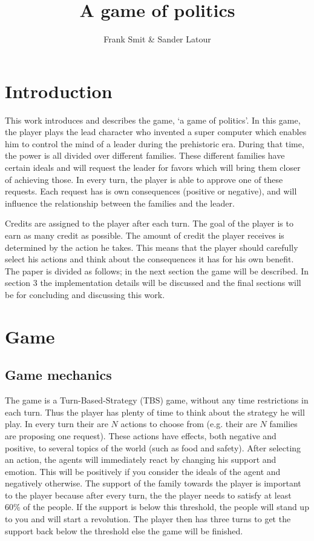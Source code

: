 \documentclass[11pt,a4paper]{article}
\author{Frank Smit \& Sander Latour}
\title{A game of politics}
\begin{document}
\maketitle

\section{Introduction}
This work introduces and describes the game, `a game of politics'. In this game, the player plays the lead character who invented a super computer which enables him to control the mind of a leader during the prehistoric era. During that time, the power is all divided over different families. These different families have certain ideals and will request the leader for favors which will bring them closer of achieving those. In every turn, the player is able to approve one of these requests. Each request has is own consequences (positive or negative), and will influence the relationship between the families and the leader. 

Credits are assigned to the player after each turn. The goal of the player is to earn as many credit as possible. The amount of credit the player receives is determined by the action he takes. This means that the player should carefully select his actions and think about the consequences it has for his own benefit.  The paper is divided as follows; in the next section the game will be described. In section 3 the implementation details will be discussed and the final sections will be for concluding and discussing this work.

\section{Game}
\subsection{Game mechanics}
The game is a Turn-Based-Strategy (TBS) game, without any time restrictions in each turn. Thus the player has plenty of time to think about the strategy he will play. In every turn their are $N$ actions to choose from (e.g. their are $N$ families are proposing one request). These actions have effects, both negative and positive, to several topics of the world (such as food and safety).  After selecting an action, the agents will immediately react by changing his support and emotion. This will be positively if you consider the ideals of the agent and negatively otherwise. The support of the family towards the player is important to the player because after every turn, the the player needs to satisfy at least 60\% of the people. If the support is below this threshold, the people will stand up to you and will start a revolution. The player then has three turns to get the support back below the threshold else the game will be finished. 
\end{document}
